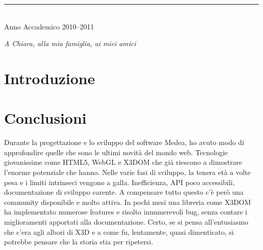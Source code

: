 \documentclass[a4paper,12pt]{report}
\def\annoaccademico{2010--2011}
\def\dedica{A Chiara, alla mia famiglia, ai miei amici}
\newlength\corpo
\begin{document}
\begin{titlepage}
\vfill

\vspace{0.8cm}

\begin{center}

\rule{40mm}{0.01mm}\\

Anno Accademico \annoaccademico

\end{center}

\end{titlepage}
\newpage
\vspace*{2.5cm}
\begin{flushright}
\begin{Large}\emph{\dedica}\end{Large}
\end{flushright}
\frenchspacing
%

\tableofcontents
\listoffigures
{}
\chapter*{Introduzione}
\pagestyle{fancy}
\fancyfoot[RO]{\thepage \hfil}



\chapter*{Conclusioni}
Durante la progettazione e lo sviluppo del software Medea, ho avuto modo di approfondire quelle che sono le ultimi novità del mondo web. Tecnologie giovanissime come HTML5, WebGL e X3DOM che già riescono a dimostrare l'enorme potenziale che hanno. Nelle varie fasi di sviluppo, la tenera età a volte pesa e i limiti intrinseci vengono a galla. Inefficienza, API poco accessibili, documentazione di sviluppo carente. A compensare tutto questo c'è però una community disponibile e molto attiva. In pochi mesi una libreria come X3DOM ha implementato numerose features e risolto innumerevoli bug, senza contare i miglioramenti apportati alla documentazione. Certo, se si pensa all'entusiasmo che c'era agli albori di X3D e a come fu, lentamente, quasi dimenticato, si potrebbe pensare che la storia stia per ripetersi.
\end{document}
